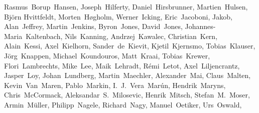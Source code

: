 \begin{flushleft}
Rasmus~Borup~Hansen,    %
Joseph~Hilferty,        %
Daniel~Hirsbrunner,     %
Martien~Hulsen,         %
Bj\"orn Hvittfeldt,     %
Morten~H\o gholm,       %
Werner~Icking,          %
Eric~Jacoboni,          %
Jakob,                  %
Alan~Jeffrey,           %
Martin~Jenkins,         %
Byron~Jones,            %
David~Jones,            %
Johannes-Maria~Kaltenbach, %
Nils~Kanning,           %
Andrzej~Kawalec,        %
Christian~Kern,         %
Alain~Kessi,            %
Axel~Kielhorn,          %
Sander~de~Kievit,       %
Kjetil~Kjernsmo,        %
Tobias~Klauser,		%
J\"org~Knappen,         %
Michael~Koundouros,     %
Matt~Kraai,             %
Tobias~Krewer,          %
Flori~Lambrechts,       %
Mike~Lee,               %
Maik~Lehradt,           %
R\'emi~Letot,           %
Axel~Liljencrantz,	%
Jasper~Loy,             %
Johan~Lundberg,         %
Martin~Maechler,        %
Alexander~Mai,          %
Claus~Malten,           %
Kevin~Van~Maren,        %
Pablo~Markin,
I.~J.~Vera~Mar\'un,     %
Hendrik~Maryns,         %
Chris~McCormack,        %
Aleksandar~S.~Milosevic, %
Henrik~Mitsch,          %
Stefan~M.~Moser,        %
Armin~M\"uller,		%
Philipp~Nagele,         %
Richard~Nagy,           %
Manuel~Oetiker,         %
Urs~Oswald,             %

\end{flushleft}
